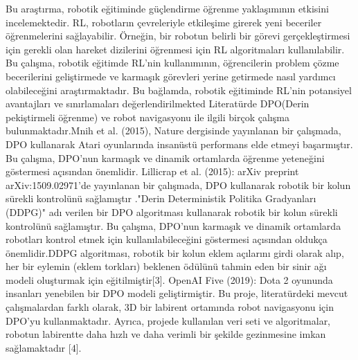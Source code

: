 \documentclass[12pt, a4paper]{article}
\begin{document}
Bu araştırma, robotik eğitiminde güçlendirme öğrenme yaklaşımının etkisini incelemektedir. RL, robotların çevreleriyle etkileşime girerek yeni beceriler öğrenmelerini sağlayabilir. Örneğin, bir robotun belirli bir görevi gerçekleştirmesi için gerekli olan hareket dizilerini öğrenmesi için RL algoritmaları kullanılabilir. Bu çalışma, robotik eğitimde RL'nin kullanımının, öğrencilerin problem çözme becerilerini geliştirmede ve karmaşık görevleri yerine getirmede nasıl yardımcı olabileceğini araştırmaktadır. Bu bağlamda, robotik eğitiminde RL'nin potansiyel avantajları ve sınırlamaları değerlendirilmekted   Literatürde DPO(Derin pekiştirmeli öğrenme) ve robot navigasyonu ile ilgili birçok çalışma bulunmaktadır.Mnih et al. (2015), Nature dergisinde yayınlanan bir çalışmada, DPO kullanarak Atari oyunlarında insanüstü performans elde etmeyi başarmıştır. Bu çalışma, DPO'nun karmaşık ve dinamik ortamlarda öğrenme yeteneğini göstermesi açısından önemlidir.         Lillicrap et al. (2015): arXiv preprint arXiv:1509.02971'de yayınlanan bir çalışmada, DPO kullanarak robotik bir kolun sürekli kontrolünü sağlamıştır ."Derin Deterministik Politika Gradyanları (DDPG)" adı verilen bir DPO algoritması kullanarak robotik bir kolun sürekli kontrolünü sağlamıştır. Bu çalışma, DPO'nun karmaşık ve dinamik ortamlarda robotları kontrol etmek için kullanılabileceğini göstermesi açısından oldukça önemlidir.DDPG algoritması, robotik bir kolun eklem açılarını girdi olarak alıp, her bir eylemin (eklem torkları) beklenen ödülünü tahmin eden bir sinir ağı modeli oluşturmak için eğitilmiştir[3].  OpenAI Five (2019): Dota 2 oyununda insanları yenebilen bir DPO modeli geliştirmiştir. Bu proje, literatürdeki mevcut çalışmalardan farklı olarak, 3D bir labirent ortamında robot navigasyonu için DPO'yu kullanmaktadır. Ayrıca, projede kullanılan veri seti ve algoritmalar, robotun labirentte daha hızlı ve daha verimli bir şekilde gezinmesine imkan sağlamaktadır [4].
\end{document}
